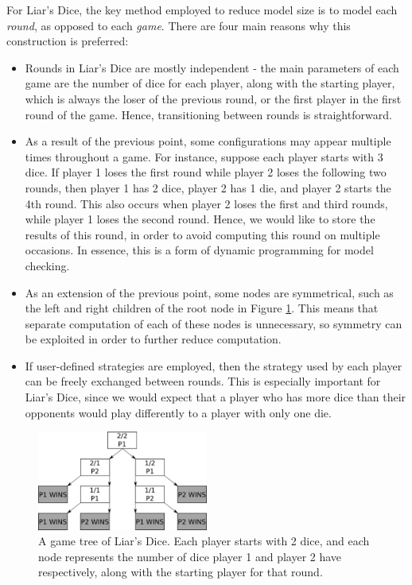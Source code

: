 For Liar's Dice, the key method employed to reduce model size is to model each \emph{round}, as opposed to each \emph{game}. There are four main reasons why this construction is preferred:

\begin{itemize}
    \item Rounds in Liar's Dice are mostly independent - the main parameters of each game are the number of dice for each player, along with the starting player, which is always the loser of the previous round, or the first player in the first round of the game. Hence, transitioning between rounds is straightforward. %
    \item As a result of the previous point, some configurations may appear multiple times throughout a game. For instance, suppose each player starts with 3 dice. If player 1 loses the first round while player 2 loses the following two rounds, then player 1 has 2 dice, player 2 has 1 die, and player 2 starts the 4th round. This also occurs when player 2 loses the first and third rounds, while player 1 loses the second round. Hence, we would like to store the results of this round, in order to avoid computing this round on multiple occasions. In essence, this is a form of dynamic programming for model checking.
    \item As an extension of the previous point, some nodes are symmetrical, such as the left and right children of the root node in Figure \ref{cs2:2_dice_game_tree}. This means that separate computation of each of these nodes is unnecessary, so symmetry can be exploited in order to further reduce computation.
    \item If user-defined strategies are employed, then the strategy used by each player can be freely exchanged between rounds. This is especially important for Liar's Dice, since we would expect that a player who has more dice than their opponents would play differently to a player with only one die.
\end{itemize}

\begin{figure}[h]
    \centering
    \includegraphics[width=0.5\textwidth]{images/LiarsDice/2_dice_game_tree.pdf}
    \caption{A game tree of Liar's Dice. Each player starts with 2 dice, and each node represents the number of dice player 1 and player 2 have respectively, along with the starting player for that round.}
    \label{cs2:2_dice_game_tree}
\end{figure}

